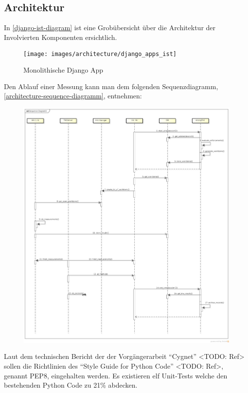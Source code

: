 \subsection{Architektur}
In \autoref{django-ist-diagram} ist eine Grobübersicht über die Architektur der
Involvierten Komponenten ersichtlich.

\begin{figure}[H]
	\centering
	\texttt{[image: images/architecture/django\_apps\_ist]}
    \caption{Monolithische Django App}
    \label{django-ist-diagram}
\end{figure}

Den Ablauf einer Messung kann man dem folgenden Sequenzdiagramm,
\autoref{architecture-sequence-diagramm}, entnehmen:
\begin{figure}[H]
	\centering
	\includegraphics[width=\textwidth]{./images/architecture/architecture_sequence_diagramm-2014-03-12}
	\caption{}
	\label{architecture-sequence-diagramm}
\end{figure}

Laut dem technischen Bericht der der Vorgängerarbeit \enquote{Cygnet} <TODO:
Ref> sollen die Richtlinien des \enquote{Style Guide for Python Code} <TODO:
Ref>, genannt PEP8, eingehalten werden. Es existieren elf Unit-Tests welche den
bestehenden Python Code zu 21\% abdecken.\\


